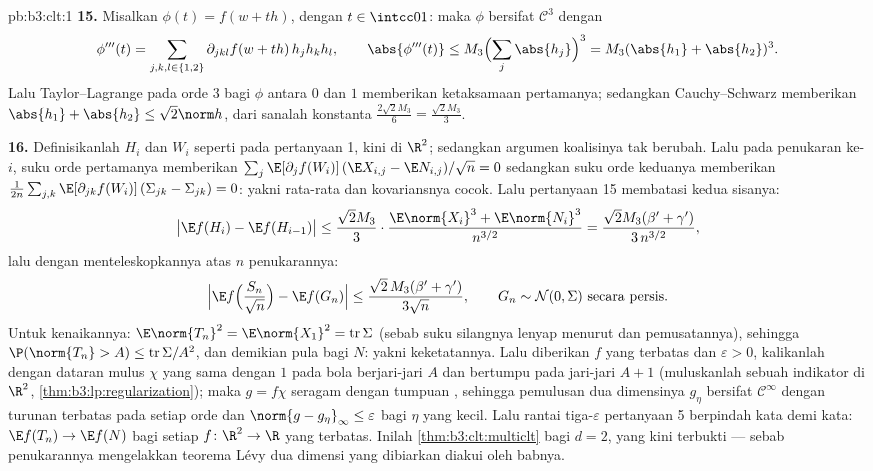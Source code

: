 \begin{solution}{pb:b3:clt:1}
\textbf{15.} Misalkan $\phi(t) = f(w + th)$, dengan $t \in \intcc01$:
maka $\phi$ bersifat $\mathcal C^3$ dengan
\[
\phi'''(t) = \sum_{j,k,l\in\{1,2\}}\partial_{jkl}f(w +
th)\,h_jh_kh_l, \qquad \abs{\phi'''(t)} \leq
M_3\Bigl(\sum_j\abs{h_j}\Bigr)^3 = M_3(\abs{h_1} +
\abs{h_2})^3 .
\]
Lalu Taylor--Lagrange pada orde $3$ bagi $\phi$ antara $0$ dan
$1$ memberikan ketaksamaan pertamanya; sedangkan Cauchy--Schwarz memberikan
$\abs{h_1} + \abs{h_2} \leq \sqrt2\norm h$, dari sanalah
konstanta $\frac{2\sqrt2M_3}6 = \frac{\sqrt2M_3}3$.

\textbf{16.} Definisikanlah $H_i$ dan $W_i$ seperti pada pertanyaan 1, kini
di $\R^2$; sedangkan argumen koalisinya tak berubah. Lalu pada
penukaran ke-$i$, suku orde pertamanya memberikan
$\sum_j\E[\partial_jf(W_i)]\,(\E X_{i,j} - \E N_{i,j})/
\sqrt n = 0$ sedangkan suku orde keduanya memberikan
$\frac1{2n}\sum_{j,k}\E[\partial_{jk}f(W_i)]\,(\Sigma_{jk}
- \Sigma_{jk}) = 0$: yakni rata-rata dan kovariansnya cocok. Lalu pertanyaan
15 membatasi kedua sisanya:
\[
\bigl|\E f(H_i) - \E f(H_{i-1})\bigr| \leq
\frac{\sqrt2M_3}3\cdot\frac{\E\norm{X_i}^3 +
\E\norm{N_i}^3}{n^{3/2}}
= \frac{\sqrt2M_3(\beta' + \gamma')}{3\,n^{3/2}},
\]
lalu dengan menteleskopkannya atas $n$ penukarannya:
\[
\Bigl|\E f\Bigl(\frac{S_n}{\sqrt n}\Bigr) - \E
f(G_n)\Bigr| \leq \frac{\sqrt2\,M_3(\beta' +
\gamma')}{3\sqrt n},
\qquad G_n \sim \mathcal N(0, \Sigma)\ \text{secara persis} .
\]
Untuk kenaikannya: $\E\norm{T_n}^2 = \E\norm{X_1}^2 =
\operatorname{tr}\Sigma$ (sebab suku silangnya lenyap menurut
 dan pemusatannya), sehingga $\P(\norm{T_n} > A) \leq
\operatorname{tr}\Sigma/A^2$, dan demikian pula bagi $N$: yakni
keketatannya. Lalu diberikan $f$ yang  terbatas dan $\varepsilon
> 0$, kalikanlah dengan dataran mulus $\chi$ yang sama dengan $1$ pada
bola berjari-jari $A$ dan bertumpu pada jari-jari $A + 1$
(muluskanlah sebuah indikator di $\R^2$,
\cref{thm:b3:lp:regularization}); maka $g = f\chi$ 
seragam dengan tumpuan , sehingga pemulusan
dua dimensinya $g_\eta$ bersifat $\mathcal C^\infty$ dengan turunan
terbatas pada setiap orde dan $\norm{g - g_\eta}_\infty
\leq \varepsilon$ bagi $\eta$ yang kecil. Lalu rantai tiga-$\varepsilon$
pertanyaan 5 berpindah kata demi kata: $\E f(T_n)
\to \E f(N)$ bagi setiap $f \colon \R^2
\to \R$ yang  terbatas. Inilah \cref{thm:b3:clt:multiclt} bagi $d = 2$,
yang kini terbukti --- sebab penukarannya mengelakkan teorema
Lévy dua dimensi yang dibiarkan diakui oleh babnya.


\end{solution}
